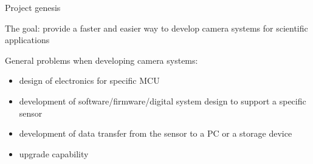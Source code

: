 \documentclass[10pt]{beamer}
\begin{document}
\begin{frame}{Project genesis}

    The goal: provide a faster and easier way to develop camera systems for scientific applications

    General problems when developing camera systems:
    \begin{itemize}
        \item design of electronics for specific MCU
        \item development of software/firmware/digital system design to support a specific sensor
        \item development of data transfer from the sensor to a PC or a storage device
        \item upgrade capability  
    \end{itemize}

\end{frame}
\end{document}
